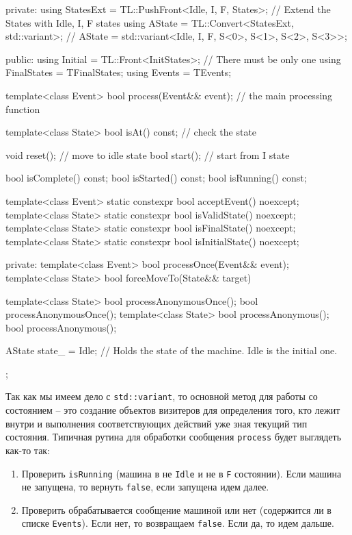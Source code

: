 \documentclass{article}
\begin{document}
{\begin{cppcode}
{private:
  using StatesExt = TL::PushFront<Idle, I, F, States>;
  // Extend the States with Idle, I, F states
  using AState = TL::Convert<StatesExt, std::variant>;
  // AState = std::variant<Idle, I, F, S<0>, S<1>, S<2>, S<3>>;

public:
  using Initial = TL::Front<InitStates>; // There must be only one
  using FinalStates = TFinalStates;
  using Events = TEvents;

  template<class Event>
  bool process(Event&& event); // the main processing function

  template<class State>
  bool isAt() const; // check the state

  void reset();      // move to idle state
  bool start();      // start from I state

  bool isComplete() const;
  bool isStarted() const;
  bool isRunning() const;

  template<class Event>
  static constexpr bool acceptEvent() noexcept;
  template<class State>
  static constexpr bool isValidState() noexcept;
  template<class State>
  static constexpr bool isFinalState() noexcept;
  template<class State>
  static constexpr bool isInitialState() noexcept;

private:
  template<class Event>
  bool processOnce(Event&& event);
  template<class State>
  bool forceMoveTo(State&& target)

  template<class State>
  bool processAnonymousOnce();
  bool processAnonymousOnce();
  template<class State>
  bool processAnonymous();
  bool processAnonymous();

  AState state_ = Idle{}; // Holds the state of the machine. Idle is the initial one.
};
\end{cppcode}
Так как мы имеем дело с \verb"std::variant", то основной метод для работы со состоянием -- это создание объектов визитеров для определения того, кто лежит внутри и выполнения соответствующих действий уже зная текущий тип состояния.
Типичная рутина для обработки сообщения \verb"process" будет выглядеть как-то так:
\begin{enumerate}
\item Проверить \verb"isRunning" (машина в не \verb"Idle" и не в \verb"F" состоянии).
Если машина не запущена, то вернуть \verb"false", если запущена идем далее.

\item Проверить обрабатывается сообщение машиной или нет (содержится ли в списке \verb"Events").
Если нет, то возвращаем \verb"false".
Если да, то идем дальше.


\end{enumerate}}
\end{document}
